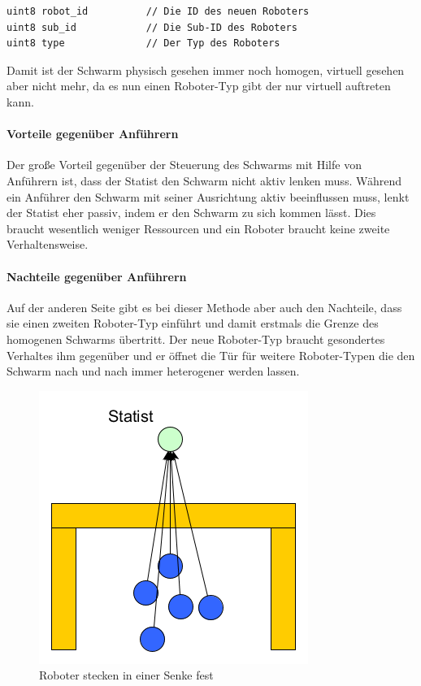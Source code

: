\begin{lstlisting}[style=ros, title=Nachrichten-Typ: New\_Robot.msg]
uint8 robot_id			// Die ID des neuen Roboters
uint8 sub_id			// Die Sub-ID des Roboters
uint8 type				// Der Typ des Roboters
\end{lstlisting}

Damit ist der Schwarm physisch gesehen immer noch homogen, virtuell gesehen aber nicht mehr, da es nun einen Roboter-Typ gibt der nur virtuell auftreten kann.

\paragraph*{Vorteile gegenüber Anführern}
Der große Vorteil gegenüber der Steuerung des Schwarms mit Hilfe von Anführern ist, dass der Statist den Schwarm nicht aktiv lenken muss. Während ein Anführer den Schwarm mit seiner Ausrichtung aktiv beeinflussen muss, lenkt der Statist eher passiv, indem er den Schwarm zu sich kommen lässt. Dies braucht wesentlich weniger Ressourcen und ein Roboter braucht keine zweite Verhaltensweise.

\paragraph*{Nachteile gegenüber Anführern}
Auf der anderen Seite gibt es bei dieser Methode aber auch den Nachteile, dass sie einen zweiten Roboter-Typ einführt und damit erstmals die Grenze des homogenen Schwarms übertritt. Der neue Roboter-Typ braucht gesondertes Verhaltes ihm gegenüber und er öffnet die Tür für weitere Roboter-Typen die den Schwarm nach und nach immer heterogener werden lassen.\\

\begin{figure}
	\includegraphics[width=\pictureWidthSmall,keepaspectratio]{graphics/StatistSenke.png}
	\caption{Roboter stecken in einer Senke fest}
	\label{pic:StatistSenke}
\end{figure}

